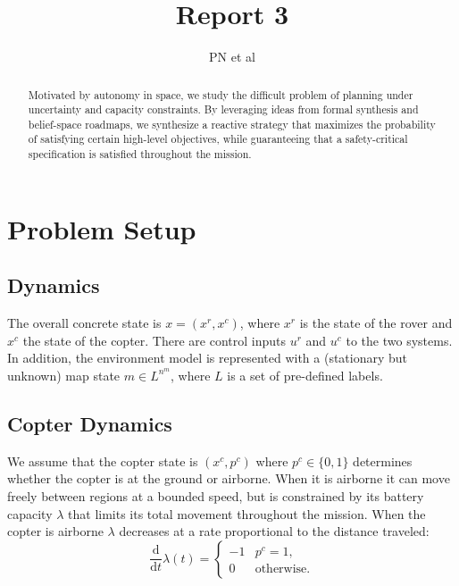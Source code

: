 \documentclass[conference]{IEEEtran}
\begin{document}
\title{\huge Report 3 }

\author{PN et al}

\maketitle

\begin{abstract}
Motivated by autonomy in space, we study the difficult problem of planning under uncertainty and capacity constraints. By leveraging ideas from formal synthesis and belief-space roadmaps, we synthesize a reactive strategy that maximizes the probability of satisfying certain high-level objectives, while guaranteeing that a safety-critical specification is satisfied throughout the mission.  
\end{abstract}

\IEEEpeerreviewmaketitle

  

\section{Problem Setup}

\subsection{Dynamics}

The overall concrete state is $x = (x^r, x^c)$, where $x^r$ is the state of the rover and $x^c$ the state of the copter. There are control inputs $u^r$ and $u^c$ to the two systems. In addition, the environment model is represented with a (stationary but unknown) map state $m \in L^{n^m}$, where $L$ is a set of pre-defined labels.

\subsection{Copter Dynamics}

We assume that the copter state is $(x^c, p^c)$ where $p^c \in \{ 0,1 \}$ determines whether the copter is at the ground or airborne. When it is airborne it can move freely between regions at a bounded speed, but is constrained by its battery capacity $\lambda$ that limits its total movement throughout the mission. When the copter is airborne $\lambda$ decreases at a rate proportional to the distance traveled:
\begin{equation}
  \frac{\mathrm{d}}{\mathrm{d}t} \lambda(t) = \begin{cases}
    -1 & p^c = 1, \\
    0 & \text{otherwise}.
  \end{cases}
\end{equation}
\end{document}
